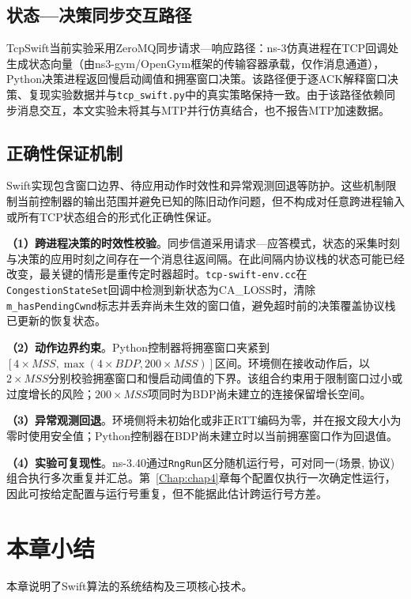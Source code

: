 \subsection{状态—决策同步交互路径}
\label{sec:sync-path}

TcpSwift当前实验采用ZeroMQ同步请求—响应路径：ns-3仿真进程在TCP回调处生成状态向量（由ns3-gym/OpenGym框架的传输容器承载，仅作消息通道），Python决策进程返回慢启动阈值和拥塞窗口决策。该路径便于逐ACK解释窗口决策、复现实验数据并与\texttt{tcp\_swift.py}中的真实策略保持一致。由于该路径依赖同步消息交互，本文实验未将其与MTP并行仿真结合，也不报告MTP加速数据。

\subsection{正确性保证机制}
\label{sec:correctness}

Swift实现包含窗口边界、待应用动作时效性和异常观测回退等防护。这些机制限制当前控制器的输出范围并避免已知的陈旧动作问题，但不构成对任意跨进程输入或所有TCP状态组合的形式化正确性保证。

\textbf{（1）跨进程决策的时效性校验}。同步信道采用请求—应答模式，状态的采集时刻与决策的应用时刻之间存在一个消息往返间隔。在此间隔内协议栈的状态可能已经改变，最关键的情形是重传定时器超时。\texttt{tcp-swift-env.cc}在\texttt{CongestionStateSet}回调中检测到新状态为CA\_LOSS时，清除\texttt{m\_hasPendingCwnd}标志并丢弃尚未生效的窗口值，避免超时前的决策覆盖协议栈已更新的恢复状态。

\textbf{（2）动作边界约束}。Python控制器将拥塞窗口夹紧到$[4 \times MSS, \max(4 \times BDP, 200 \times MSS)]$区间。环境侧在接收动作后，以$2\times MSS$分别校验拥塞窗口和慢启动阈值的下界。该组合约束用于限制窗口过小或过度增长的风险；$200 \times MSS$项同时为BDP尚未建立的连接保留增长空间。

\textbf{（3）异常观测回退}。环境侧将未初始化或非正RTT编码为零，并在报文段大小为零时使用安全值；Python控制器在BDP尚未建立时以当前拥塞窗口作为回退值。

\textbf{（4）实验可复现性}。ns-3.40通过\texttt{RngRun}区分随机运行号，可对同一(场景, 协议)组合执行多次重复并汇总。第~\ref{Chap:chap4}章每个配置仅执行一次确定性运行，因此可按给定配置与运行号重复，但不能据此估计跨运行号方差。

\section{本章小结}

本章说明了Swift算法的系统结构及三项核心技术。


